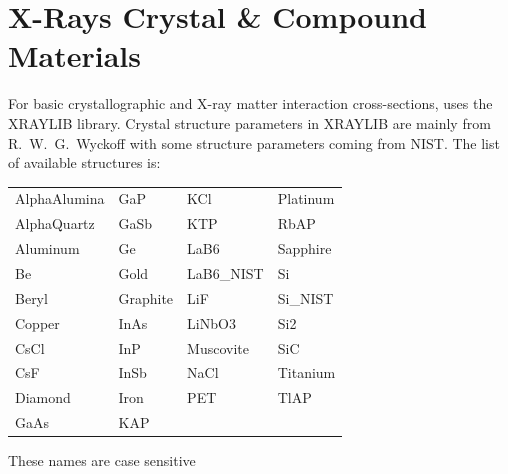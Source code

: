 \section{X-Rays Crystal \& Compound Materials}
\label{s:cryst.list}

For basic crystallographic and X-ray matter interaction cross-sections,
\bmad uses the XRAYLIB\cite{b:xraylib} library. Crystal structure
parameters in XRAYLIB are mainly from R.~W.~G.~Wyckoff\cite{b:wyckoff}
with some structure parameters coming from NIST. The list of available
structures is:
\begin{center}
\begin{tabular}{llll}
AlphaAlumina & GaP       & KCl        & Platinum  \\
AlphaQuartz  & GaSb      & KTP        & RbAP      \\
Aluminum     & Ge        & LaB6       & Sapphire  \\
Be           & Gold      & LaB6_NIST  & Si        \\
Beryl        & Graphite  & LiF        & Si_NIST   \\
Copper       & InAs      & LiNbO3     & Si2       \\
CsCl         & InP       & Muscovite  & SiC       \\
CsF          & InSb      & NaCl       & Titanium  \\
Diamond      & Iron      & PET        & TlAP      \\
GaAs         & KAP       &            &           \\
\end{tabular}
\end{center}
These names are case sensitive

